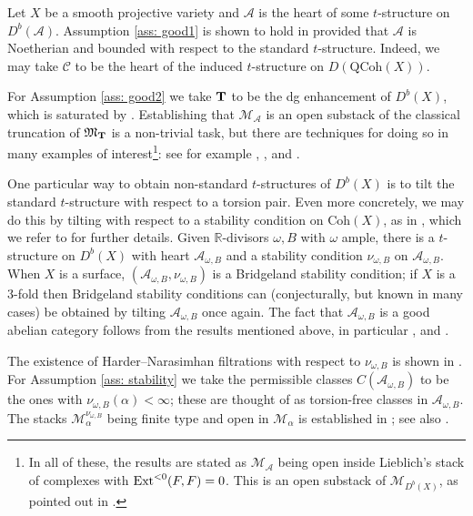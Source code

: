 \documentclass[12pt]{amsart}
\theoremstyle{definition}
\newcommand{\BR}{{\mathbb{R}}}
\newcommand{\CA}{{\mathcal A}}
\newcommand{\CC}{{\mathcal C}}
\newcommand{\CM}{{\mathcal M}}
\newcommand{\1}{\mathbf 1}
\newcommand{\bfT}{{\bf T}}
\newcommand{\FM}{{\mathfrak{M}}}
\newcommand{\Ext}{\mathcal{E}\text{xt}}
\newcommand{\Coh}{\mathrm{Coh}}
\newcommand{\QCoh}{\mathrm{QCoh}}
\renewcommand{\Ext}{\textup{Ext}}
\begin{document}
Let $X$ be a smooth projective variety and $\CA$ is the heart of some $t$-structure on $D^b(\CA)$. Assumption \ref{ass: good1} is shown to hold in \cite[Proposition 6.1.7]{HLstructure} provided that $\CA$ is Noetherian and bounded with respect to the standard $t$-structure. Indeed, we may take $\CC$ to be the heart of the induced $t$-structure on $D(\QCoh(X))$. 

For Assumption \ref{ass: good2} we take $\bfT$ to be the dg enhancement of $D^b(X)$, which is saturated by \cite[Lemma 3.27]{TV07}. Establishing that $\CM_\CA$ is an open substack of the classical truncation of $\FM_{\bfT}$ is a non-trivial task, but there are techniques for doing so in many examples of interest\footnote{In all of these, the results are stated as $\CM_\CA$ being open inside Lieblich's \cite{lieblich} stack of complexes with $\Ext^{<0}(F, F)=0$. This is an open substack of $\CM_{D^b(X)}$, as pointed out in \cite[Corollary 3.21]{TV07}.}: see for example \cite[Section 4]{PiyToda}, \cite[Theorem A.3]{arcarabertram}, \cite[Proposition 6.2.7]{HLstructure} and \cite[Proposition 4.6]{BCR}.

One particular way to obtain non-standard $t$-structures of $D^b(X)$ is to tilt the standard $t$-structure with respect to a torsion pair. Even more concretely, we may do this by tilting with respect to a stability condition on $\Coh(X)$, as in \cite[Section 3]{BMTbogomolov}, which we refer to for further details. Given $\BR$-divisors $\omega, B$ with $\omega$ ample, there is a $t$-structure on $D^b(X)$ with heart $\CA_{\omega, B}$ and a stability condition $\nu_{\omega, B}$ on $\CA_{\omega, B}$. When $X$ is a surface, $(\CA_{\omega, B}, \nu_{\omega, B})$ is a Bridgeland stability condition; if $X$ is a $3$-fold then Bridgeland stability conditions can (conjecturally, but known in many cases) be obtained by tilting $\CA_{\omega, B}$ once again. The fact that $\CA_{\omega, B}$ is a good abelian category follows from the results mentioned above, in particular \cite[Proposition 5.2.2]{BMTbogomolov}, \cite[Proposition 6.1.7]{HLstructure} and \cite[Theorem A.3]{arcarabertram}.

The existence of Harder--Narasimhan filtrations with respect to $\nu_{\omega, B}$ is shown in \cite[Lemma 3.2.4]{BMTbogomolov}. For Assumption \ref{ass: stability} we take the permissible classes $C(\CA_{\omega, B})$ to be the ones with $\nu_{\omega, B}(\alpha)<\infty$; these are thought of as torsion-free classes in $\CA_{\omega, B}$. The stacks $\CM_{\alpha}^{\nu_{\omega, B}}$ being finite type and open in $\CM_\alpha$ is established in \cite{todaK3, PiyToda}; see also \cite[Proposition 6.2.7]{HLstructure}. 
\end{document}
